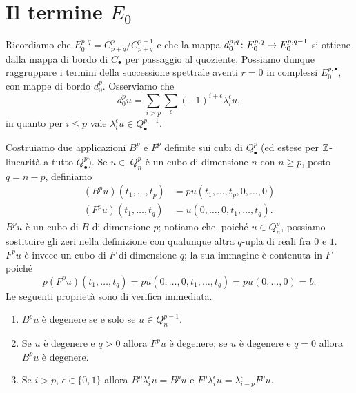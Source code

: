 \section{Il termine \texorpdfstring{$E_0$}{E0}}
Ricordiamo che $E^{p,q}_0=C^p_{p+q}/C^{p-1}_{p+q}$ e che la mappa $\map{d^{p,q}_0}{E^{p,q}_0}{E^{p,q-1}_0}$ si ottiene dalla mappa di bordo di $C_\bullet$ per passaggio al quoziente. Possiamo dunque raggruppare i termini della successione spettrale aventi $r=0$ in complessi $E^{p,\bullet}_0$, con mappe di bordo $d^p_0$. Osserviamo che
$$
d^p_0u=\sum_{i>p}\sum_\epsilon(-1)^{i+\epsilon}\lambda^\epsilon_iu,
$$
in quanto per $i\le p$ vale $\lambda^\epsilon_iu\in Q^{p-1}_\bullet$.


Costruiamo due applicazioni $B^p$ e $F^p$ definite sui cubi di $Q^p_\bullet$ (ed estese per $\mathbb{Z}$-linearità a tutto $Q^p_\bullet$). Se $u\in\ Q^p_n$ è un cubo di dimensione $n$ con $n\ge p$, posto $q=n-p$, definiamo
\begin{align*}
(B^pu)(t_1,\ldots,t_p)&=pu(t_1,\ldots,t_p,0,\ldots,0)\\
(F^pu)(t_1,\ldots,t_q)&=u(0,\ldots,0,t_1,\ldots,t_q).
\end{align*}
$B^pu$ è un cubo di $B$ di dimensione $p$; notiamo che, poiché $u\in Q^p_n$, possiamo sostituire gli zeri nella definizione con qualunque altra $q$-upla di reali fra $0$ e $1$. $F^pu$ è invece un cubo di $F$ di dimensione $q$; la sua immagine è contenuta in $F$ poiché
$$
p(F^pu)(t_1,\ldots,t_q)=pu(0,\ldots,0,t_1,\ldots,t_q)=pu(0,\ldots,0)=b.
$$
Le seguenti proprietà sono di verifica immediata.
\begin{enumerate}
\item\label{spectral-sequence-of-fibration:pr1} $B^pu$ è degenere se e solo se $u\in Q^{p-1}_n$.
\item\label{spectral-sequence-of-fibration:pr2} Se $u$ è degenere e $q>0$ allora $F^pu$ è degenere; se $u$ è degenere e $q=0$ allora $B^pu$ è degenere.
\item\label{spectral-sequence-of-fibration:pr3} Se $i>p$, $\epsilon\in\{0,1\}$ allora $B^p\lambda^\epsilon_iu=B^pu$ e $F^p\lambda^\epsilon_iu=\lambda^\epsilon_{i-p}F^pu$.
\end{enumerate}

